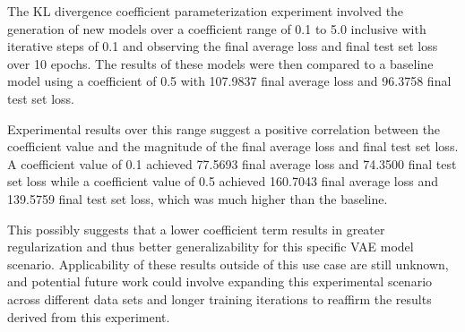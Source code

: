 \documentclass[sigplan]{acmart}
\begin{document}
The KL divergence coefficient parameterization experiment involved the generation of new models over a coefficient range of 0.1 to 5.0 inclusive with iterative steps of 0.1 and observing the final average loss and final test set loss over 10 epochs. The results of these models were then compared to a baseline model using a coefficient of 0.5 with 107.9837 final average loss and 96.3758 final test set loss.

Experimental results over this range suggest a positive correlation between the coefficient value and the magnitude of the final average loss and final test set loss. A coefficient value of 0.1 achieved 77.5693 final average loss and 74.3500 final test set loss while a coefficient value of 0.5 achieved 160.7043 final average loss and 139.5759 final test set loss, which was much higher than the baseline.

This possibly suggests that a lower coefficient term results in greater regularization and thus better generalizability for this specific VAE model scenario. Applicability of these results outside of this use case are still unknown, and potential future work could involve expanding this experimental scenario across different data sets and longer training iterations to reaffirm the results derived from this experiment.


\nocite{*}

\end{document}

